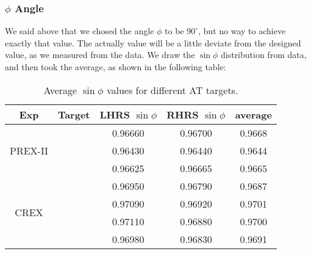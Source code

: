 \subsubsection{$\phi$ Angle}
We said above that we chosed the angle $\phi$ to be $90^\circ$, but no way to 
achieve exactly that value. The actually value will be a little deviate from
the designed value, as we measured from the data. We draw the $\sin\phi$ distribution
from data, and then took the average, as shown in the following table:
\begin{table}[!htbp]
    \centering
    \begin{tabular}{c c | c c c}
	\hline
	Exp & Target	& LHRS $\sin\phi$   & RHRS $\sin\phi$	& average   \\
	\hline
	\multirow{3}{*}{PREX-II}
	    & \C    & 0.96660   & 0.96700	& 0.9668    \\ 
	    & \ca   & 0.96430   & 0.96440	& 0.9644    \\ 
	    & \Pb   & 0.96625   & 0.96665	& 0.9665    \\ 
	\hline
	\multirow{4}{*}{CREX}
	    & \C    & 0.96950   & 0.96790	& 0.9687    \\ 
	    & \ca   & 0.97090   & 0.96920	& 0.9701    \\ 
	    & \Ca   & 0.97110   & 0.96880	& 0.9700    \\ 
	    & \Pb   & 0.96980   & 0.96830	& 0.9691    \\ 
	\hline
    \end{tabular}
    \caption{Average $\sin\phi$ values for different AT targets.}
\end{table}


